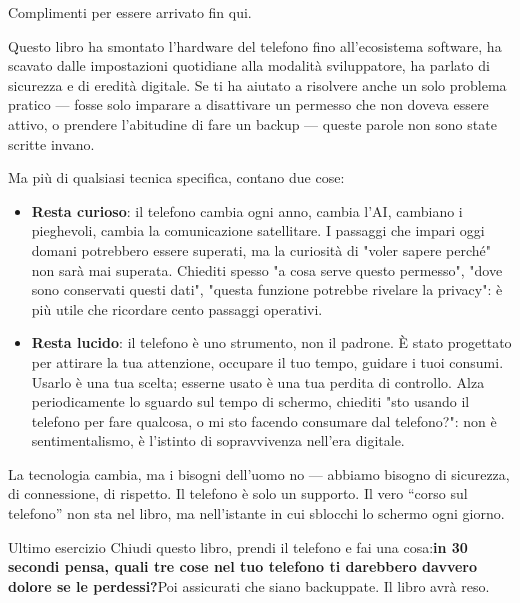
Complimenti per essere arrivato fin qui.

Questo libro ha smontato l'hardware del telefono fino all'ecosistema software, ha scavato dalle impostazioni quotidiane alla modalità sviluppatore, ha parlato di sicurezza e di eredità digitale. Se ti ha aiutato a risolvere anche un solo problema pratico — fosse solo imparare a disattivare un permesso che non doveva essere attivo, o prendere l'abitudine di fare un backup — queste parole non sono state scritte invano.

Ma più di qualsiasi tecnica specifica, contano due cose:

\begin{itemize}
  \item \textbf{Resta curioso}: il telefono cambia ogni anno, cambia l'AI, cambiano i pieghevoli, cambia la comunicazione satellitare. I passaggi che impari oggi domani potrebbero essere superati, ma la curiosità di "voler sapere perché" non sarà mai superata. Chiediti spesso "a cosa serve questo permesso", "dove sono conservati questi dati", "questa funzione potrebbe rivelare la privacy": è più utile che ricordare cento passaggi operativi.
  \item \textbf{Resta lucido}: il telefono è uno strumento, non il padrone. È stato progettato per attirare la tua attenzione, occupare il tuo tempo, guidare i tuoi consumi. Usarlo è una tua scelta; esserne usato è una tua perdita di controllo. Alza periodicamente lo sguardo sul tempo di schermo, chiediti "sto usando il telefono per fare qualcosa, o mi sto facendo consumare dal telefono?": non è sentimentalismo, è l'istinto di sopravvivenza nell'era digitale.
\end{itemize}

La tecnologia cambia, ma i bisogni dell'uomo no — abbiamo bisogno di sicurezza, di connessione, di rispetto. Il telefono è solo un supporto. Il vero “corso sul telefono” non sta nel libro, ma nell'istante in cui sblocchi lo schermo ogni giorno.

\begin{tcbpractice}{Ultimo esercizio}
Chiudi questo libro, prendi il telefono e fai una cosa:\textbf{in 30 secondi pensa, quali tre cose nel tuo telefono ti darebbero davvero dolore se le perdessi?}Poi assicurati che siano backuppate. Il libro avrà reso.

\end{tcbpractice}
